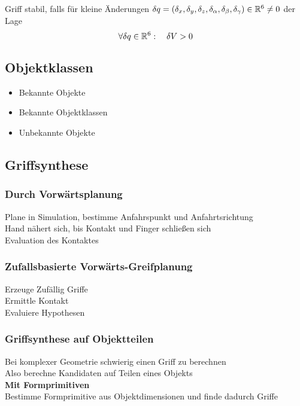 Griff stabil, falls für kleine Änderungen \(\delta q = (\delta_x, \delta_y, \delta_z, \delta_\alpha,\delta_\beta, \delta_\gamma) \in
\mathbb{R}^6 \neq 0\) der Lage
\[\forall \delta q \in \mathbb{R}^6: \quad \delta V > 0\]

\subsection{Objektklassen}%
\label{gpl:sub:objektklassen}
\begin{itemize}
\item Bekannte Objekte
\item Bekannte Objektklassen
\item Unbekannte Objekte
\end{itemize}

\subsection{Griffsynthese}%
\label{gpl:sub:griffsynthese}
\subsubsection{Durch Vorwärtsplanung}%
\label{gpl:ssub:vorwaertsplanung}
Plane in Simulation, bestimme Anfahrspunkt und Anfahrtsrichtung\\
Hand nähert sich, bis Kontakt und Finger schließen sich\\
Evaluation des Kontaktes

\subsubsection{Zufallsbasierte Vorwärts-Greifplanung}%
\label{gpl:ssub:zufallsbasierte-greifplanung}
Erzeuge Zufällig Griffe\\
Ermittle Kontakt\\
Evaluiere Hypothesen

\subsubsection{Griffsynthese auf Objektteilen}%
\label{gpl:ssub:griffsynthese-objektteile}
Bei komplexer Geometrie schwierig einen Griff zu berechnen\\
Also berechne Kandidaten auf Teilen eines Objekts\\

\textbf{Mit Formprimitiven}\\
Bestimme Formprimitive aus Objektdimensionen und finde dadurch Griffe\\

